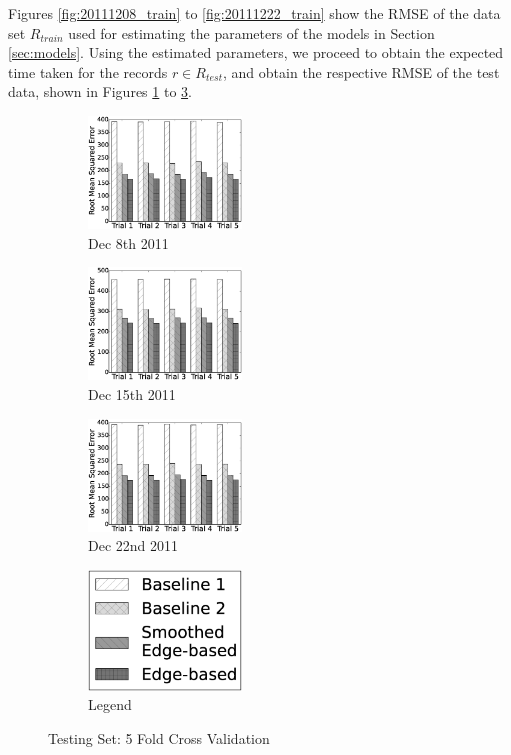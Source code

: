 \documentclass{sig-alternate}
\begin{document}
Figures \ref{fig:20111208_train} to \ref{fig:20111222_train} show the RMSE of the data set $R_{train}$ used for estimating the parameters of the models in Section \ref{sec:models}. Using the estimated parameters, we proceed to obtain the expected time taken for the records $r \in R_{test}$, and obtain the respective RMSE of the test data, shown in Figures \ref{fig:20111208_test} to \ref{fig:20111222_test}.
\begin{figure}[htb]
	\centering
	\begin{subfigure}{1.6in}
		\includegraphics[width=1.6in]{20111208_test} %
		\caption{Dec 8th 2011}
		\label{fig:20111208_test}
	\end{subfigure}
	\begin{subfigure}{1.6in}
		\includegraphics[width=1.6in]{20111215_test} %
		\caption{Dec 15th 2011}
		\label{fig:20111215_test}
	\end{subfigure}
	\begin{subfigure}{1.6in}
		\includegraphics[width=1.6in]{20111222_test} %
		\caption{Dec 22nd 2011}
		\label{fig:20111222_test}
	\end{subfigure}
	\begin{subfigure}{1.6in}
		\includegraphics[width=1.6in]{legend} %
		\caption{Legend}
		\label{fig:legend_test}
	\end{subfigure}
	\caption{Testing Set: 5 Fold Cross Validation}
	\label{fig:5_fold_test}
\end{figure}
\end{document}
